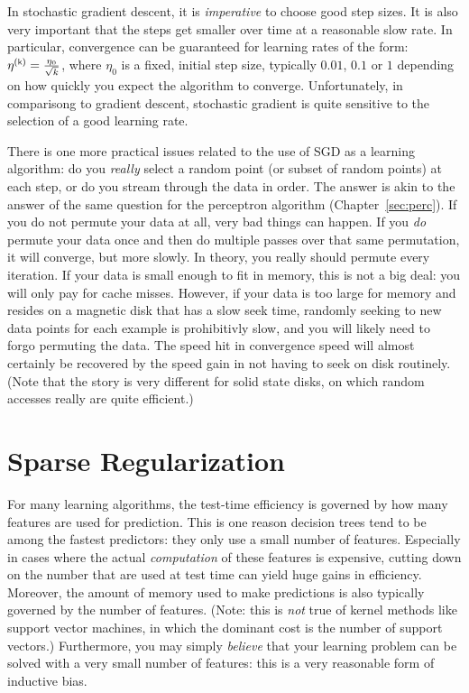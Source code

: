 In stochastic gradient descent, it is \emph{imperative} to choose good
step sizes.  It is also very important that the steps get smaller over
time at a reasonable slow rate.  In particular, convergence can be
guaranteed for learning rates of the form: $\eta\kth = \frac {\eta_0}
{\sqrt{k}}$, where $\eta_0$ is a fixed, initial step size, typically
$0.01$, $0.1$ or $1$ depending on how quickly you expect the algorithm
to converge.  Unfortunately, in comparisong to gradient descent,
stochastic gradient is quite sensitive to the selection of a good
learning rate.

There is one more practical issues related to the use of SGD as a
learning algorithm: do you \emph{really} select a random point (or
subset of random points) at each step, or do you stream through the
data in order.  The answer is akin to the answer of the same question
for the perceptron algorithm (Chapter~\ref{sec:perc}).  If you do not
permute your data at all, very bad things can happen.  If you
\emph{do} permute your data once and then do multiple passes over that
same permutation, it will converge, but more slowly.  In theory, you
really should permute every iteration.  If your data is small enough
to fit in memory, this is not a big deal: you will only pay for cache
misses.  However, if your data is too large for memory and resides on
a magnetic disk that has a slow seek time, randomly seeking to new
data points for each example is prohibitivly slow, and you will likely
need to forgo permuting the data.  The speed hit in convergence speed
will almost certainly be recovered by the speed gain in not having to
seek on disk routinely.  (Note that the story is very different for
solid state disks, on which random accesses really are quite
efficient.)

%

\section{Sparse Regularization}

For many learning algorithms, the test-time efficiency is governed by
how many features are used for prediction.  This is one reason
decision trees tend to be among the fastest predictors: they only use
a small number of features.  Especially in cases where the actual
\emph{computation} of these features is expensive, cutting down on the
number that are used at test time can yield huge gains in efficiency.
Moreover, the amount of memory used to make predictions is also
typically governed by the number of features.  (Note: this is
\emph{not} true of kernel methods like support vector machines, in
which the dominant cost is the number of support vectors.)
Furthermore, you may simply \emph{believe} that your learning problem
can be solved with a very small number of features: this is a very
reasonable form of inductive bias.

